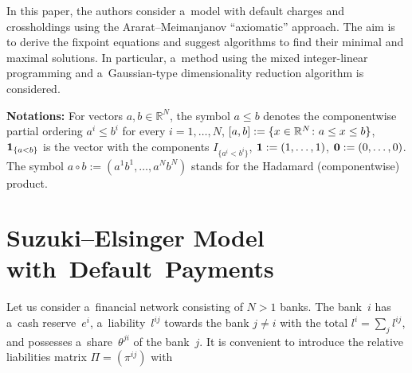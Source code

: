 \begin{multicols}{2}
In this paper, the authors consider  a~model with default charges and crossholdings using the Ararat--Meimanjanov
``axiomatic'' approach. The aim is to derive the fixpoint equations and suggest algorithms to find their 
minimal and maximal solutions.  In particular,  a~method using the mixed integer-linear programming
and  a~Gaussian-type dimensionality reduction algorithm is considered. 

\smallskip

\noindent
\textbf{Notations:} For vectors $a, b \in \mathbb{R}^N$, the symbol $a\le b$ denotes the componentwise partial ordering
 $a^i \leq b^i$ for every $i = 1, \dots, N$,  $[a,b]:=\{x\in 
\mathbb{R}^N\colon a\linebreak \le x\le b\}$, ${\bf 1}_{\{a<b\}}$
is the vector with the components  $I_{\{a^i< b^i\}}$,  ${\bf 1}:=(1,\dots,1)$, ${\bf 0}:=(0,\dots,0)$.    
The symbol  $a\circ b:=(a^1b^1,\dots,a^Nb^N)$ stands for the Hadamard (componentwise) product.  


 

\vspace*{-2pt}

\section{Suzuki--Elsinger Model with~Default~Payments}

\vspace*{-4pt}


\noindent
Let us consider a~financial network consisting of $N>1$ banks. The bank~$i$ has a~cash reserve~$e^i$, a~liability~$l^{ij}$ towards the bank 
$j\neq i$ with the total  $l^i=\sum\nolimits_j l^{ij}$, and possesses a~share~$\theta ^{ji}$ of the bank~$j$.  
It is convenient to introduce the   relative liabilities matrix $\Pi=(\pi^{ij})$ with 


\end{multicols}
